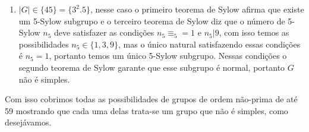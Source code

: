 \documentclass{article}
\begin{document}
\begin{enumerate}
\begin{enumerate}
			\item $|G| \in \{45\} = \{3^{2}.5 \}$, nesse caso o primeiro teorema de Sylow afirma que existe um 5-Sylow subgrupo e o terceiro teorema de Sylow diz que o número de 5-Sylow $n_{5}$ deve satisfazer as condições $n_{5} \equiv_{5} = 1$ e $n_{5}|9$, com isso temos as possibilidades $n_{5} \in \{1, 3, 9\}$, mas o único natural satisfazendo essas condições é $n_{5} = 1$, portanto temos um único 5-Sylow subgrupo. Nessas condições o segundo teorema de Sylow garante que esse subgrupo é normal, portanto $G$ não é simples.
		\end{enumerate}
		
		Com isso cobrimos todas as possibilidades de grupos de ordem não-prima de até 59 mostrando que cada uma delas trata-se um grupo que não é simples, como desejávamos.
		
	\end{enumerate}
	
	
\end{document}
